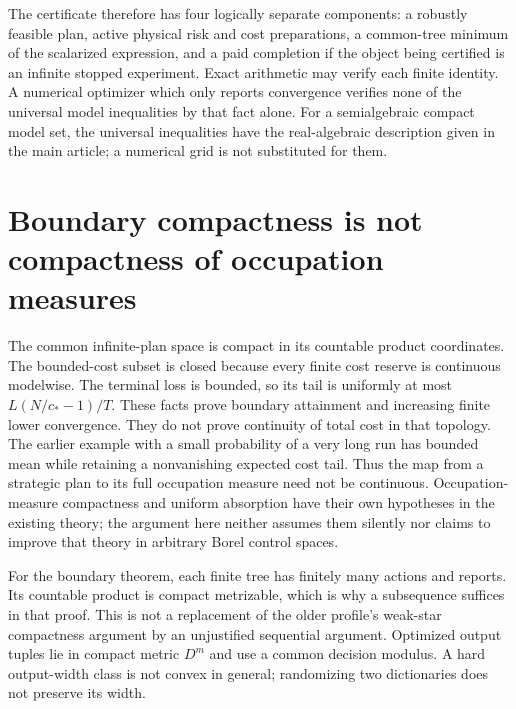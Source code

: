 The certificate therefore has four logically separate components: a robustly feasible plan, active physical risk and cost preparations, a common-tree minimum of the scalarized expression, and a paid completion if the object being certified is an infinite stopped experiment. Exact arithmetic may verify each finite identity. A numerical optimizer which only reports convergence verifies none of the universal model inequalities by that fact alone. For a semialgebraic compact model set, the universal inequalities have the real-algebraic description given in the main article; a numerical grid is not substituted for them.

\section{Boundary compactness is not compactness of occupation measures}
The common infinite-plan space is compact in its countable product coordinates. The bounded-cost subset is closed because every finite cost reserve is continuous modelwise. The terminal loss is bounded, so its tail is uniformly at most $L(N/c_*-1)/T$. These facts prove boundary attainment and increasing finite lower convergence. They do not prove continuity of total cost in that topology. The earlier example with a small probability of a very long run has bounded mean while retaining a nonvanishing expected cost tail. Thus the map from a strategic plan to its full occupation measure need not be continuous. Occupation-measure compactness and uniform absorption have their own hypotheses in the existing theory; the argument here neither assumes them silently nor claims to improve that theory in arbitrary Borel control spaces.

For the boundary theorem, each finite tree has finitely many actions and reports. Its countable product is compact metrizable, which is why a subsequence suffices in that proof. This is not a replacement of the older profile's weak-star compactness argument by an unjustified sequential argument. Optimized output tuples lie in compact metric $D^m$ and use a common decision modulus. A hard output-width class is not convex in general; randomizing two dictionaries does not preserve its width.
